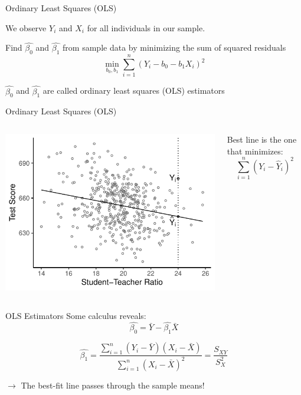 \documentclass{./../div_teaching_slides}
\begin{document}
\begin{frame}{Ordinary Least Squares (OLS)}
\begin{witemize}
  \item We observe $Y_i$ and $X_i$ for all individuals in our sample.
  \item Find $\hat{\beta_0}$ and $\hat{\beta_1}$ from sample data by minimizing the sum of squared residuals
$$ \min_{b_0, b_1} \sum_{i=1}^n(Y_i - {b_0} - {b_1} X_i)^2$$
\item $\hat{\beta_0}$ and $\hat{\beta_1}$ are called ordinary least squares (OLS) estimators
\end{witemize}
\end{frame}

\begin{frame}{Ordinary Least Squares (OLS)}
\begin{columns}[c]
\begin{column}{0.75\textwidth}
\includegraphics{./../../output/lrm_caschool_ols.pdf}
\end{column}
\begin{column}{0.25\textwidth}
Best line is the one that minimizes: $$\sum_{i=1}^n(Y_i - \hat{Y}_i)^2$$
\vfill
\end{column}
\end{columns}
\end{frame}

\begin{frame}{OLS Estimators}
Some calculus reveals:
 $$ \hat{\beta_0} = \bar{Y}-\hat{\beta_1} \bar{X} $$

 $$ \hat{\beta_1} = \frac{ \sum_{i=1}^n(Y_i - \bar{Y})(X_i-\bar{X})}{ \sum_{i=1}^n(X_i - \bar{X})^2 } = \frac{S_{XY}}{S^2_X}$$ 
 
 \vspace{1cm}
 $\rightarrow$ The best-fit line passes through the sample means!
\end{frame}
\end{document}
